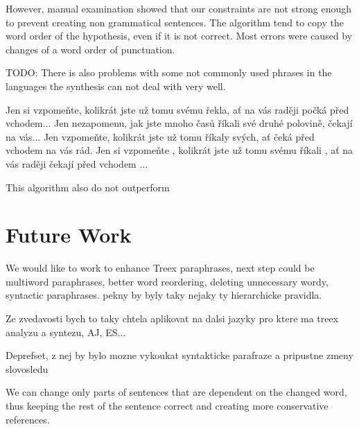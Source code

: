\documentclass[11pt]{article}
\begin{document}
However, manual examination showed that our constraints are not strong enough 
to prevent creating non grammatical sentences. The algorithm tend to copy the
word order of the hypothesis, even if it is not correct. Most errors were caused
by changes of a word order of punctuation. 

TODO: There is also problems with some not commonly used phrases in the languages the synthesis
can not deal with very well.

Jen si vzpomeňte, kolikrát jste už tomu svému řekla, ať na vás raději počká před vchodem...
Jen nezapomenu, jak jste mnoho časů říkali své druhé polovině, čekají na vás...
Jen vzpomeňte, kolikrát jste už tomu říkaly svých, ať čeká před vchodem na vás rád.
Jen si vzpomeňte , kolikrát jste už tomu svému říkali , ať na vás raději čekají před vchodem ...

This algorithm also do not outperform 






\section{Future Work}
We would like to work to enhance Treex paraphrases, next step could be multiword 
paraphrases, better word reordering, deleting unnecessary wordy, syntactic paraphrases.
 pekny by byly
taky nejaky ty hierarchicke pravidla. 

Ze zvedavosti bych to taky chtela aplikovat na dalsi jazyky pro ktere ma treex
analyzu a syntezu, AJ, ES...

Deprefset, z nej by bylo mozne vykoukat syntakticke parafraze a pripustne zmeny slovosledu

We can change only parts of sentences that are dependent on the changed word, 
thus keeping the rest of the sentence correct and creating more conservative 
references.



\end{document}
